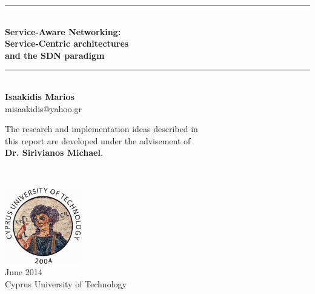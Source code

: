 \begin{titlepage}

\begin{center}

\newcommand{\HRule}{\rule{\linewidth}{0.5mm}}



\HRule \\[0.5cm]
{ \LARGE \bfseries {\huge Service-Aware Networking:} \\[0.2cm] Service-Centric architectures\\[0.2cm]and the SDN paradigm}\\[0.5cm]

\HRule \\[1cm]

{\LARGE \bf
Isaakidis Marios\\
}
misaakidis@yahoo.gr

\vfill

{\large
The research and implementation ideas described in\\ this report are developed under the advisement of\\ \textbf{Dr. Sirivianos Michael}.}
\end{center}
 ~\\[1.5cm]
\begin{flushright}
\includegraphics[width=0.25\textwidth]{./cut-logo-2}\\[0.2cm]
{\large
June 2014 \\
Cyprus University of Technology
}
\end{flushright}

\end{titlepage}